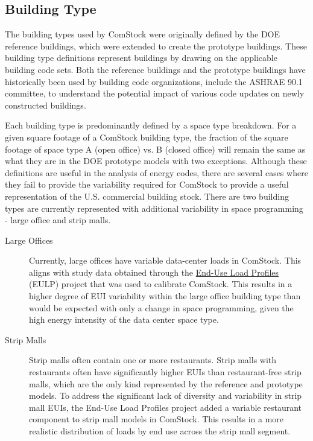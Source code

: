 \subsection{Building Type}
\label{sec:building_type_meta}

The building types used by ComStock were originally defined by the DOE reference buildings, which were extended to create the prototype buildings. These building type definitions represent buildings by drawing on the applicable building code sets. Both the reference buildings and the prototype buildings have historically been used by building code organizations, include the ASHRAE 90.1 committee, to understand the potential impact of various code updates on newly constructed buildings.

Each building type is predominantly defined by a space type breakdown. For a given square footage of a ComStock building type, the fraction of the square footage of space type A (open office) vs. B (closed office) will remain the same as what they are in the DOE prototype models with two exceptions. Although these definitions are useful in the analysis of energy codes, there are several cases where they fail to provide the variability required for ComStock to provide a useful representation of the U.S. commercial building stock. There are two building types are currently represented with additional variability in space programming - large office and strip malls.

\begin{description}
\item[Large Offices] Currently, large offices have variable data-center loads in ComStock. This aligns with study data obtained through the \href{https://www.nrel.gov/docs/fy22osti/80889.pdf}{End-Use Load Profiles} (EULP) project that was used to calibrate ComStock. This results in a higher degree of EUI variability within the large office building type than would be expected with only a change in space programming, given the high energy intensity of the data center space type.
\item[Strip Malls] Strip malls often contain one or more restaurants. Strip malls with restaurants often have significantly higher EUIs than restaurant-free strip malls, which are the only kind represented by the reference and prototype models. To address the significant lack of diversity and variability in strip mall EUIs, the End-Use Load Profiles project added a variable restaurant component to strip mall models in ComStock. This results in a more realistic distribution of loads by end use across the strip mall segment.
\end{description}

